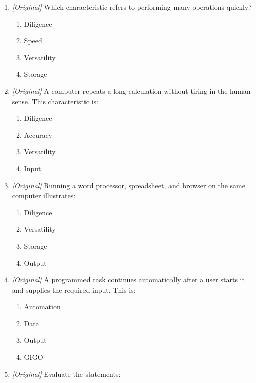 \documentclass[11pt]{article}
\begin{document}
\begin{enumerate}[label=\textbf{Q\arabic*.}, leftmargin=*]
\begin{enumerate}[label=\Alph*.]
    \item Output is always more reliable than input.
    \item Storage automatically repairs incorrect data.
    \item A computer cannot process numerical data.
  \end{enumerate}
\item \textit{[Original]} Which characteristic refers to performing many
  operations quickly?
  \begin{enumerate}[label=\Alph*.]
    \item Diligence
    \item Speed
    \item Versatility
    \item Storage
  \end{enumerate}
\item \textit{[Original]} A computer repeats a long calculation without
  tiring in the human sense. This characteristic is:
  \begin{enumerate}[label=\Alph*.]
    \item Diligence
    \item Accuracy
    \item Versatility
    \item Input
  \end{enumerate}
\item \textit{[Original]} Running a word processor, spreadsheet, and browser
  on the same computer illustrates:
  \begin{enumerate}[label=\Alph*.]
    \item Diligence
    \item Versatility
    \item Storage
    \item Output
  \end{enumerate}
\item \textit{[Original]} A programmed task continues automatically after a
  user starts it and supplies the required input. This is:
  \begin{enumerate}[label=\Alph*.]
    \item Automation
    \item Data
    \item Output
    \item GIGO
  \end{enumerate}
\item \textit{[Original]} Evaluate the statements:
  \begin{enumerate}[label=\Roman*.]

\end{enumerate}
\end{enumerate}
\end{document}
